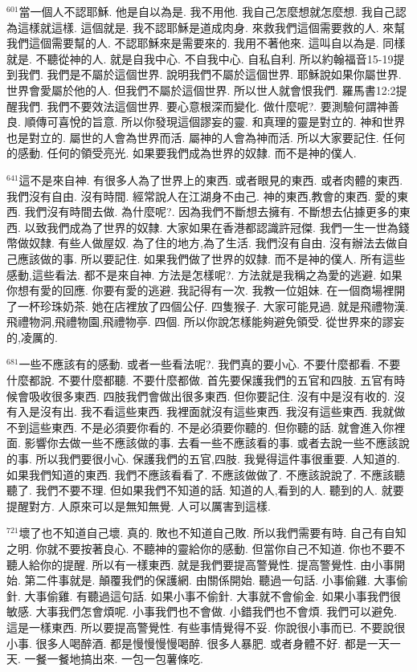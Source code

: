 \documentclass{book}
\begin{document}
$^{601}$當一個人不認耶穌.
他是自以為是.
我不用他.
我自己怎麼想就怎麼想.
我自己認為這樣就這樣.
這個就是.
我不認耶穌是道成肉身.
來救我們這個需要救的人.
來幫我們這個需要幫的人.
不認耶穌來是需要來的.
我用不著他來.
這叫自以為是.
同樣就是.
不聽從神的人.
就是自我中心.
不自我中心.
自私自利.
所以約翰福音15-19提到我們.
我們是不屬於這個世界.
說明我們不屬於這個世界.
耶穌說如果你屬世界.
世界會愛屬於他的人.
但我們不屬於這個世界.
所以世人就會恨我們.
羅馬書12:2提醒我們.
我們不要效法這個世界.
要心意根深而變化.
做什麼呢?.
要測驗何謂神善良.
順傳可喜悅的旨意.
所以你發現這個謬妄的靈.
和真理的靈是對立的.
神和世界也是對立的.
屬世的人會為世界而活.
屬神的人會為神而活.
所以大家要記住.
任何的感動.
任何的領受亮光.
如果要我們成為世界的奴隸.
而不是神的僕人.

$^{641}$這不是來自神.
有很多人為了世界上的東西.
或者眼見的東西.
或者肉體的東西.
我們沒有自由.
沒有時間.
經常說人在江湖身不由己.
神的東西,教會的東西.
愛的東西.
我們沒有時間去做.
為什麼呢?.
因為我們不斷想去擁有.
不斷想去佔據更多的東西.
以致我們成為了世界的奴隸.
大家如果在香港都認識許冠傑.
我們一生一世為錢幣做奴隸.
有些人做屋奴.
為了住的地方,為了生活.
我們沒有自由.
沒有辦法去做自己應該做的事.
所以要記住.
如果我們做了世界的奴隸.
而不是神的僕人.
所有這些感動,這些看法.
都不是來自神.
方法是怎樣呢?.
方法就是我稱之為愛的逃避.
如果你想有愛的回應.
你要有愛的逃避.
我記得有一次.
我教一位姐妹.
在一個商場裡開了一杯珍珠奶茶.
她在店裡放了四個公仔.
四隻猴子.
大家可能見過.
就是飛禮物漢.
飛禮物洞,飛禮物園,飛禮物亭.
四個.
所以你說怎樣能夠避免領受.
從世界來的謬妄的,凌厲的.

$^{681}$一些不應該有的感動.
或者一些看法呢?.
我們真的要小心.
不要什麼都看.
不要什麼都說.
不要什麼都聽.
不要什麼都做.
首先要保護我們的五官和四肢.
五官有時候會吸收很多東西.
四肢我們會做出很多東西.
但你要記住.
沒有中是沒有收的.
沒有入是沒有出.
我不看這些東西.
我裡面就沒有這些東西.
我沒有這些東西.
我就做不到這些東西.
不是必須要你看的.
不是必須要你聽的.
但你聽的話.
就會進入你裡面.
影響你去做一些不應該做的事.
去看一些不應該看的事.
或者去說一些不應該說的事.
所以我們要很小心.
保護我們的五官,四肢.
我覺得這件事很重要.
人知道的.
如果我們知道的東西.
我們不應該看看了.
不應該做做了.
不應該說說了.
不應該聽聽了.
我們不要不理.
但如果我們不知道的話.
知道的人,看到的人.
聽到的人.
就要提醒對方.
人原來可以是無知無覺.
人可以厲害到這樣.

$^{721}$壞了也不知道自己壞.
真的.
敗也不知道自己敗.
所以我們需要有時.
自己有自知之明.
你就不要按著良心.
不聽神的靈給你的感動.
但當你自己不知道.
你也不要不聽人給你的提醒.
所以有一樣東西.
就是我們要提高警覺性.
提高警覺性.
由小事開始.
第二件事就是.
顛覆我們的保護網.
由關係開始.
聽過一句話.
小事偷雞.
大事偷針.
大事偷雞.
有聽過這句話.
如果小事不偷針.
大事就不會偷金.
如果小事我們很敏感.
大事我們怎會煩呢.
小事我們也不會做.
小錯我們也不會煩.
我們可以避免.
這是一樣東西.
所以要提高警覺性.
有些事情覺得不妥.
你說很小事而已.
不要說很小事.
很多人喝醉酒.
都是慢慢慢慢喝醉.
很多人暴肥.
或者身體不好.
都是一天一天.
一餐一餐地搞出來.
一包一包薯條吃.
\end{document}
